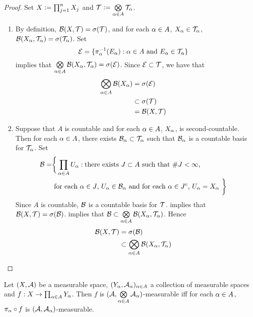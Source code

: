 \documentclass{book}
\begin{document}
 	\begin{proof} Set $X \vcentcolon= \prod_{j=1}^n X_j$ and $\mathcal{T} \vcentcolon= \bigotimes\limits_{\alpha \in A} \mathcal{T}_{\alpha}$.
 		\begin{enumerate}
 			\item By definition, $\mathcal{B}(X, \mathcal{T}) = \sigma(\mathcal{T})$, and for each $\alpha \in A$, $X_{\alpha} \in \mathcal{T}_{\alpha}$, $\mathcal{B}(X_{\alpha}, \mathcal{T}_{\alpha}) = \sigma(\mathcal{T}_{\alpha})$. Set 
 			$$\mathcal{E} = \{\pi^{-1}_{\alpha}(E_{\alpha}): \alpha \in A \text{ and } E_{\alpha} \in \mathcal{T}_{\alpha} \}$$ 
 			 implies that $\bigotimes\limits_{\alpha \in A} \mathcal{B}(X_{\alpha}, \mathcal{T}_{\alpha}) = \sigma(\mathcal{E})$. Since $\mathcal{E} \subset \mathcal{T}$, we have that
 			\begin{align*}
 				\bigotimes_{\alpha \in A} \mathcal{B}(X_{\alpha}) 
 				& = \sigma(\mathcal{E}) \\
 				& \subset \sigma(\mathcal{T}) \\
 				& = \mathcal{B}(X, \mathcal{T})
 			\end{align*}
 			\item Suppose that $A$ is countable and for each $\alpha \in A$, $X_{\alpha}$, is second-countable. Then for each $\alpha \in A$, there exists $\mathcal{B}_{\alpha} \subset \mathcal{T}_{\alpha}$ such that $\mathcal{B}_{\alpha}$ is a countable basis for $\mathcal{T}_{\alpha}$. Set 
 			\begin{align*}
 				\mathcal{B} = 
 				& \bigg \{\prod_{\alpha \in A} U_{\alpha}: \text{there exists $J \subset A$ such that $ \# J < \infty$, } \\
 				& \text{ for each $\alpha \in J$, $U_{\alpha} \in \mathcal{B}_{\alpha}$ and for each $\alpha \in J^c$, $U_{\alpha} = X_{\alpha}$ } \bigg \}
 			\end{align*} 
 			Since $A$ is countable, $\mathcal{B}$ is a countable basis for $\mathcal{T}$.  implies that $\mathcal{B}(X, \mathcal{T}) = \sigma(\mathcal{B})$.  implies that $\mathcal{B} \subset \bigotimes\limits_{\alpha \in A} \mathcal{B}(X_{\alpha}, \mathcal{T}_{\alpha})$. Hence
 			\begin{align*}
 				\mathcal{B}(X, \mathcal{T}) 
 				& = \sigma(\mathcal{B}) \\
 				& \subset \bigotimes_{\alpha \in A} \mathcal{B}(X_{\alpha}, \mathcal{T}_{\alpha}) 
 			\end{align*}
 		\end{enumerate}
 	\end{proof}
	
	\begin{ex} 
		Let $(X, \mathcal{A})$ be a measurable space, $(Y_{\alpha}, \mathcal{A}_{\alpha})_{\alpha \in A}$ a collection of measurable spaces and $f: X \rightarrow \prod_{\alpha \in A}Y_{\alpha}$. Then $f$ is $(\mathcal{A}, \bigotimes\limits_{\alpha \in A} \mathcal{A}_{\alpha})$-measurable iff for each $\alpha \in A$, $\pi_{\alpha} \circ f$ is $(\mathcal{A}, \mathcal{A}_{\alpha})$-measurable.
	\end{ex}
	
\end{document}
